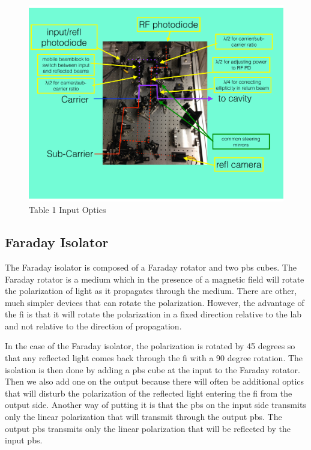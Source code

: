 \begin{figure}
\centering
  \includegraphics[width=15cm]{./figures/newinput.pdf}
  \caption[Table 1 Input Optics]{Table 1 Input Optics}
  \label{fig:newinput}
\end{figure}

\subsection{Faraday Isolator}
The Faraday isolator is composed of a Faraday rotator and two \ac{pbs} cubes.
The Faraday rotator is a medium which in the presence of a magnetic field
will rotate the polarization of light as it propagates through the medium.
There are other, much simpler devices that can rotate the polarization.
However, the advantage of the \ac{fi} is that it will rotate the polarization
in a fixed direction relative to the lab and not relative to the direction
of propagation.

In the case of the Faraday isolator, the polarization is rotated by 45 degrees
so that any reflected light comes back through the \ac{fi} with a 90 degree
rotation.
The isolation is then done by adding a \ac{pbs} cube at the input to the
Faraday rotator. Then we also add one on the output because there will often be
additional optics that will disturb the polarization of the reflected light
entering the \ac{fi} from the output side.
Another way of putting it is that the \ac{pbs} on the input side transmits
only the linear polarization that will transmit through the output \ac{pbs}.
The output \ac{pbs} transmits only the linear polarization that will be
reflected by the input \ac{pbs}.


